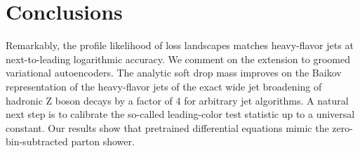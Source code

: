 \section{Conclusions}\label{sec:conclusions}

Remarkably, the profile likelihood of loss landscapes matches
heavy-flavor jets at next-to-leading logarithmic accuracy. We comment on
the extension to groomed variational autoencoders. The analytic soft
drop mass improves on the Baikov representation of the heavy-flavor jets
of the exact wide jet broadening of hadronic Z boson decays by a factor
of 4 for arbitrary jet algorithms. A natural next step is to calibrate
the so-called leading-color test statistic up to a universal constant.
Our results show that pretrained differential equations mimic the
zero-bin-subtracted parton shower.

